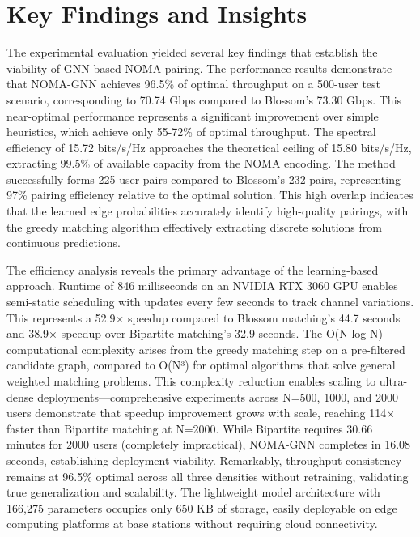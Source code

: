 \section{Key Findings and Insights}

The experimental evaluation yielded several key findings that establish the viability of GNN-based NOMA pairing. The performance results demonstrate that NOMA-GNN achieves 96.5\% of optimal throughput on a 500-user test scenario, corresponding to 70.74 Gbps compared to Blossom's 73.30 Gbps. This near-optimal performance represents a significant improvement over simple heuristics, which achieve only 55-72\% of optimal throughput. The spectral efficiency of 15.72 bits/s/Hz approaches the theoretical ceiling of 15.80 bits/s/Hz, extracting 99.5\% of available capacity from the NOMA encoding. The method successfully forms 225 user pairs compared to Blossom's 232 pairs, representing 97\% pairing efficiency relative to the optimal solution. This high overlap indicates that the learned edge probabilities accurately identify high-quality pairings, with the greedy matching algorithm effectively extracting discrete solutions from continuous predictions.

The efficiency analysis reveals the primary advantage of the learning-based approach. Runtime of 846 milliseconds on an NVIDIA RTX 3060 GPU enables semi-static scheduling with updates every few seconds to track channel variations. This represents a 52.9× speedup compared to Blossom matching's 44.7 seconds and 38.9× speedup over Bipartite matching's 32.9 seconds. The O(N log N) computational complexity arises from the greedy matching step on a pre-filtered candidate graph, compared to O(N³) for optimal algorithms that solve general weighted matching problems. This complexity reduction enables scaling to ultra-dense deployments—comprehensive experiments across N=500, 1000, and 2000 users demonstrate that speedup improvement grows with scale, reaching 114× faster than Bipartite matching at N=2000. While Bipartite requires 30.66 minutes for 2000 users (completely impractical), NOMA-GNN completes in 16.08 seconds, establishing deployment viability. Remarkably, throughput consistency remains at 96.5\% optimal across all three densities without retraining, validating true generalization and scalability. The lightweight model architecture with 166,275 parameters occupies only 650 KB of storage, easily deployable on edge computing platforms at base stations without requiring cloud connectivity.

